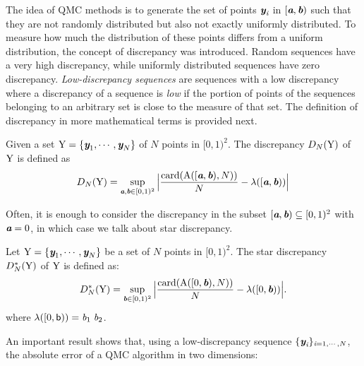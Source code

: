 The idea of QMC methods is to generate the set of points $\textit{\textbf{y}}_{\textit{i}}$ in $[\textit{\textbf{a}},\textit{\textbf{b}})$ such that they are not randomly distributed but also not exactly uniformly distributed. 
To measure how much the distribution of these points differs from a uniform distribution, the concept of discrepancy was introduced.  
Random sequences have a very high discrepancy, while uniformly distributed sequences have zero discrepancy. 
\textit{Low-discrepancy sequences} are sequences with a low discrepancy \cite{owen2003quasi} where a discrepancy of a sequence is \textit{low} if the portion of points of the sequences belonging to an arbitrary set is close to the measure of that set.
The definition of discrepancy in more mathematical terms is provided next. 
\begin{definition}
Given a set $\mbox{$\textup{Y}$} = \{\textit{\textbf{y}}_1, \cdots, \textit{\textbf{y}}_N\}$ of $N$ points in $[0,1)^2$. The discrepancy $D_N(\mbox{$\textup{Y}$})$ of $\mbox{$\textup{Y}$}$ is defined as
\begin{equation}
D_N(\mbox{$\textup{Y}$}) = \sup_{\textit{\textbf{a}}, \textit{\textbf{b}}\in[0,1)^2}\Big|\frac{\textrm{card}(\mbox{$\textup{A}$}([\textit{\textbf{a}},\textit{\textbf{b}}), N))}{N}-\lambda([\textit{\textbf{a}}, \textit{\textbf{b}}))\Big|
\end{equation}
\end{definition} 
Often, it is enough to consider the discrepancy in the subset $[\textit{\textbf{a}},\textit{\textbf{b}})\subseteq[0,1)^2$ with $\textit{\textbf{a}}=0$, in which case we talk about star discrepancy.
 \begin{definition}
Let $\mbox{$\textup{Y}$} = \{\textit{\textbf{y}}_1, \cdots, \textit{\textbf{y}}_N\}$ be a set of $N$ points in $[0,1)^2$. The  star discrepancy $D^*_N(\mbox{$\textup{Y}$})$ of $\mbox{$\textup{Y}$}$ is defined as:
\begin{equation}
D^*_N(\mbox{$\textup{Y}$}) = \sup_{\textit{\textbf{b}}\in[0,1)^2}\Big|\frac{\textrm{card}(\mbox{$\textup{A}$}([0,\textit{\textbf{b}}), N))}{N}-\lambda([0, \textit{\textbf{b}}))\Big|.
\end{equation}
where $\lambda([0, \textsf{b})) = \textit{b}_1\;\textit{b}_2$. 
\end{definition}
An important result shows that, using a low-discrepancy sequence $\{\textit{\textbf{y}}_{\textit{i}}\}_{\textit{i}=1, \cdots, N}$, the absolute error of a QMC algorithm in two dimensions:
